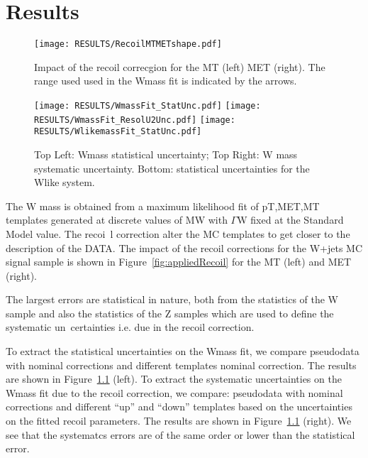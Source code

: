 \chapter{Results}

{\color{magenta}{HERE SLIDES:7,9,10,11,30}}

\begin{figure}[h!]
  \begin{center}
    \texttt{[image: RESULTS/RecoilMTMETshape.pdf]}
    \caption{
      Impact of the recoil correcgion for the MT (left) MET (right).
      The range used used in the Wmass fit is indicated by the arrows.
    }
    \label{fig:appliedRecoil}
  \end{center}
  \begin{center}
    \texttt{[image: RESULTS/WmassFit\_StatUnc.pdf]}
    \texttt{[image: RESULTS/WmassFit\_ResolU2Unc.pdf]}
    \texttt{[image: RESULTS/WlikemassFit\_StatUnc.pdf]}
    \caption{
      Top Left: Wmass statistical uncertainty; Top Right: W mass systematic uncertainty.
      Bottom: statistical uncertainties for the Wlike system.
    }
    \label{fig:resultsFit}
  \end{center}
\end{figure}

The W mass is obtained from a maximum likelihood fit of pT,MET,MT templates generated at discrete values of MW with $\Gamma$W fixed at the Standard Model value. The recoi\
l correction alter the MC templates to get closer to the description of the DATA.
The impact of the recoil corrections for the W+jets MC signal sample is shown in Figure~\ref{fig:appliedRecoil} for the MT (left) and MET (right).

The largest errors are statistical in nature, both from the statistics of the W sample and also the statistics of the Z samples which are used to define the systematic un\
certainties i.e. due in the recoil correction.

To extract the statistical uncertainties on the Wmass fit, we compare
pseudodata with nominal corrections and different templates nominal correction.
The results are shown in Figure~\ref{fig:resultsFit} (left).
To extract the systematic uncertainties on the Wmass fit due to the recoil correction, we compare:
pseudodata with nominal corrections and different “up” and “down” templates based on the uncertainties on the fitted recoil parameters.
The results are shown in Figure~\ref{fig:resultsFit} (right).
We see that the systematcs errors are of the same order or lower than the statistical error.

